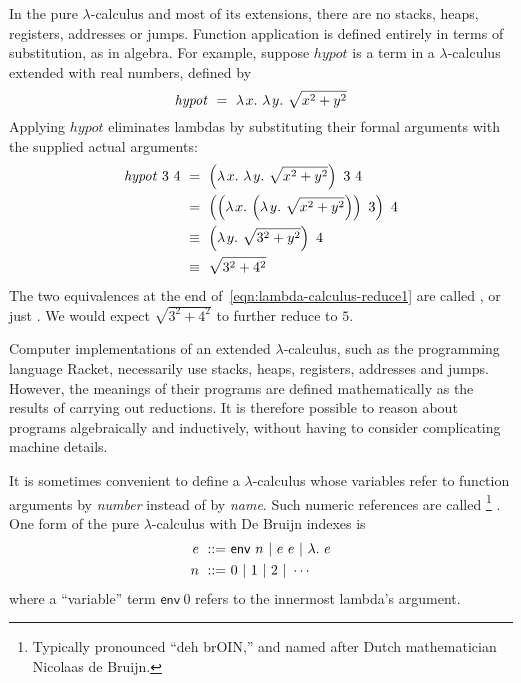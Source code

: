 In the pure $\lambda$-calculus and most of its extensions, there are no stacks, heaps, registers, addresses or jumps.
Function application is defined entirely in terms of substitution, as in algebra.
For example, suppose  $\mathit{hypot}$ is a term in a $\lambda$-calculus extended with real numbers, defined by
\begin{equation}
	\mathit{hypot}\ =\ \lambda\mspace{2mu}{x}\ldotp\,\lambda\mspace{2mu}{y}\ldotp\, \sqrt{x^2 + y^2}
\end{equation}
Applying $\mathit{hypot}$ eliminates lambdas by substituting their formal arguments with the supplied actual arguments:
\begin{equation}
\begin{aligned}
	\mathit{hypot}~3~4
		&\ =\ \left(\lambda\mspace{2mu}{x}\ldotp\,\lambda\mspace{2mu}{y}\ldotp\, \sqrt{x^2 + y^2}\right)~3~4 \\
		&\ =\ \left(\left(\lambda\mspace{2mu}{x}\ldotp\,\left(\lambda\mspace{2mu}{y}\ldotp\, \sqrt{x^2 + y^2}\right)\right)~3\right)~4 \\
		&\ \equiv\ \left(\lambda\mspace{2mu}{y}\ldotp\, \sqrt{3^2 + y^2}\right)~4 \\
		&\ \equiv\ \sqrt{3^2 + 4^2} \\
\end{aligned}
\label{eqn:lambda-calculus-reduce1}
\end{equation}
The two equivalences at the end of~\eqref{eqn:lambda-calculus-reduce1} are called , or just .
We would expect $\sqrt{3^2 + 4^2}$ to further reduce to $5$.

Computer implementations of an extended $\lambda$-calculus, such as the programming language Racket, necessarily use stacks, heaps, registers, addresses and jumps.
However, the meanings of their programs are defined mathematically as the results of carrying out reductions.
It is therefore possible to reason about programs algebraically and inductively, without having to consider complicating machine details.

It is sometimes convenient to define a $\lambda$-calculus whose variables refer to function arguments by \emph{number} instead of by \emph{name}.
Such numeric references are called \footnote{Typically pronounced ``deh brOIN,'' and named after Dutch mathematician Nicolaas de Bruijn.} .
One form of the pure $\lambda$-calculus with De Bruijn indexes is
\begin{equation}
\begin{aligned}
	e\ ::=&\ \mathsf{env}~n\ |\ e~e\ |\ \lambda\ldotp\, e \\
	n\ ::=&\ 0\ |\ 1\ |\ 2\ |\ \cdots
\end{aligned}
\end{equation}
where a ``variable'' term $\mathsf{env}~0$ refers to the innermost lambda's argument.

